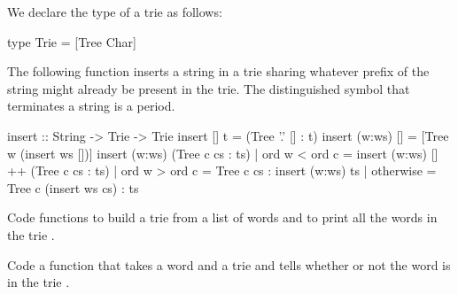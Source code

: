\noindent
We declare the type of a trie as follows:
%
\begin{curry}
type Trie = [Tree Char]
\end{curry}
%
The following function inserts a string in a trie
sharing whatever prefix of the string might already be present in the trie.
The distinguished symbol that terminates a string is a period.
%
\begin{curry}
insert :: String -> Trie -> Trie
insert []     t  = (Tree '.' [] : t)
insert (w:ws) [] = [Tree w (insert ws [])]
insert (w:ws) (Tree c cs : ts)
  | ord w < ord c = insert (w:ws) [] ++ (Tree c cs : ts)
  | ord w > ord c = Tree c cs : insert (w:ws) ts
  | otherwise     = Tree c (insert ws cs) : ts
\end{curry}
%
\begin{exercise}
Code functions to build a trie from a list of words
and to print all the words in the trie
.
\end{exercise}
%
\begin{exercise}
Code a function that takes a word and a trie and tells
whether or not the word is in the trie
.
\end{exercise}

% 

